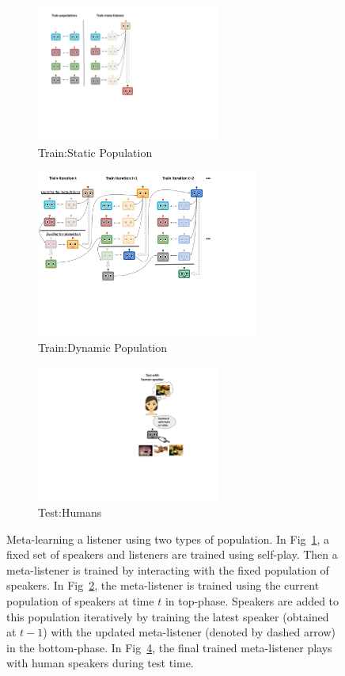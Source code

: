 \documentclass{article}
\begin{document}
\begin{figure}
    \centering
    \begin{subfigure}{0.25\linewidth}
    \includegraphics[width=\linewidth, height=4.5cm]{figs/static-schematic.pdf}
    \vspace{5mm}
    \caption{Train:Static Population}
    \label{fig:static-schematic}
    \end{subfigure}
    \hfill
    \begin{subfigure}{0.55\linewidth}
    \includegraphics[width=\linewidth, height=5.5cm]{figs/dynamic-schematic.pdf}
    \vspace{-4mm}
    \caption{Train:Dynamic Population}
    \label{fig:adaptive-schematic}
    \end{subfigure}
    \hfill
    \begin{subfigure}{0.15\linewidth}
    \includegraphics[width=\linewidth, height=4.5cm]{figs/test-human.pdf}
    \vspace{5mm}
    \caption{Test:Humans}
    \label{fig:test-humans}
    \end{subfigure}
    \caption{Meta-learning a listener using two types of population. In Fig~\ref{fig:static-schematic}, a fixed set of speakers and listeners are trained using self-play. Then a meta-listener is trained by interacting with the fixed population of speakers. In Fig~\ref{fig:adaptive-schematic}, the meta-listener is trained using the current population of speakers at time $t$ in top-phase. Speakers are added to this population iteratively by training the latest speaker (obtained at $t-1$) with the updated meta-listener (denoted by dashed arrow) in the bottom-phase. In Fig~\ref{fig:test-humans}, the final trained meta-listener plays with human speakers during test time.}
\end{figure}
\end{document}
